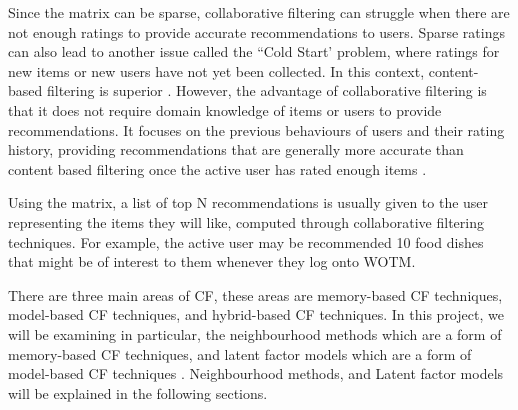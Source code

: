 Since the matrix can be sparse, collaborative filtering can struggle when there are not enough ratings to provide accurate recommendations to users. Sparse ratings can also lead to another issue called the ``Cold Start' problem, where ratings for new items or new users have not yet been collected. In this context, content-based filtering is superior \cite{koren2009matrix}. However, the advantage of collaborative filtering is that it does not require domain knowledge of items or users to provide recommendations. It focuses on the previous behaviours of users and their rating history, providing recommendations that are generally more accurate than content based filtering once the active user has rated enough items \cite{koren2009matrix, schafer2007collaborative}. 

Using the matrix, a list of top N recommendations is usually given to the user representing the items they will like, computed through collaborative filtering techniques. For example, the active user may be recommended 10 food dishes that might be of interest to them whenever they log onto WOTM.  

There are three main areas of CF, these areas are memory-based CF techniques, model-based CF techniques, and hybrid-based CF techniques. In this project, we will be examining in particular, the neighbourhood methods which are a form of memory-based CF techniques, and latent factor models which are a form of model-based CF techniques \cite{survey, koren2009matrix}. Neighbourhood methods, and Latent factor models will be explained in the following sections. 


